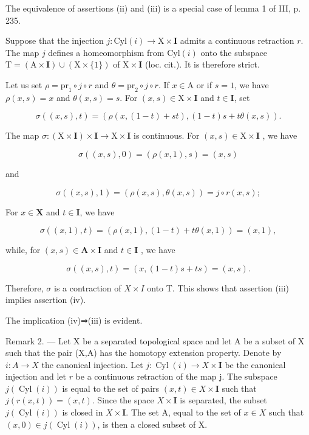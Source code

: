   The equivalence of assertions (ii) and (iii) is a special case of lemma 1 of III, p. 235.

Suppose that the injection \(j\colon \mathrm{Cyl}(i)\to \mathrm{X}\times \mathbf{I}\) admits a continuous retraction \(r\). The map \(j\) defines a homeomorphism from \(\mathrm{Cyl}(i)\) onto the subspace \(\mathrm{T} = (\mathrm{A}\times \mathbf{I})\cup (\mathrm{X}\times \{1\})\) of \(\mathrm{X}\times \mathbf{I}\) (loc. cit.). It is therefore strict.

Let us set \(\rho = \mathrm{pr}_1\circ j\circ r\) and \(\theta = \mathrm{pr}_2\circ j\circ r\). If \(x\in \mathrm{A}\) or if \(s = 1\), we have \(\rho (x,s) = x\) and \(\theta (x,s) = s\). For \((x,s)\in \mathrm{X}\times \mathbf{I}\) and \(t\in \mathbf{I}\), set

\[
\sigma ((x, s), t) = (\rho (x, (1 - t) + s t), (1 - t) s + t \theta (x, s)).
\]

The map \(\sigma\colon(\mathrm{X}\times\mathbf{I})\times\mathbf{I}\to\mathrm{X}\times\mathbf{I}\) is continuous. For \((x,s)\in\mathrm{X}\times\mathbf{I}\) , we have

\[
\sigma ((x, s), 0) = (\rho (x, 1), s) = (x, s)
\]

and

\[
\sigma ((x, s), 1) = (\rho (x, s), \theta (x, s)) = j \circ r (x, s);
\]

For \(x\in \mathbf{X}\) and \(t\in \mathbf{I}\), we have

\[
\sigma ((x, 1), t) = (\rho (x, 1), (1 - t) + t \theta (x, 1)) = (x, 1),
\]

while, for \((x,s)\in\mathbf{A}\times\mathbf{I}\) and \(t\in\mathbf{I}\) , we have

\[
\sigma ((x, s), t) = (x, (1 - t) s + t s) = (x, s).
\]

Therefore, \(\sigma\) is a contraction of \(X\times I\) onto T. This shows that assertion (iii) implies assertion (iv).

The implication (iv)⇒(iii) is evident.

Remark 2. --- Let X be a separated topological space and let A be a subset of X such that the pair (X,A) has the homotopy extension property. Denote by \(i\colon A\to X\) the canonical injection. Let \(j\colon\operatorname{Cyl}(i)\to X\times\mathbf{I}\) be the canonical injection and let \(r\) be a continuous retraction of the map j. The subspace \(j(\operatorname{Cyl}(i))\) is equal to the set of pairs \((x,t)\in X\times\mathbf{I}\) such that \(j(r(x,t))=(x,t)\). Since the space \(X\times\mathbf{I}\) is separated, the subset \(j(\operatorname{Cyl}(i))\) is closed in \(X\times\mathbf{I}\). The set A, equal to the set of \(x\in X\) such that \((x,0)\in j(\operatorname{Cyl}(i))\), is then a closed subset of X.

